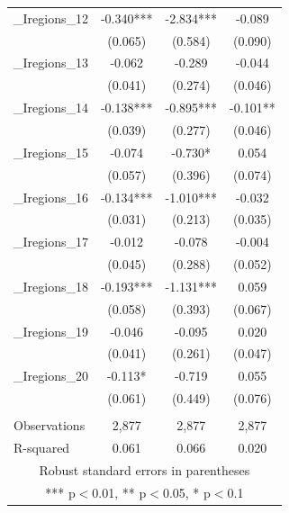 \documentclass[]{article}
\begin{document}
\begin{tabular}{lccc}
\_Iregions\_12 & -0.340*** & -2.834*** & -0.089 \\
 & (0.065) & (0.584) & (0.090) \\
\_Iregions\_13 & -0.062 & -0.289 & -0.044 \\
 & (0.041) & (0.274) & (0.046) \\
\_Iregions\_14 & -0.138*** & -0.895*** & -0.101** \\
 & (0.039) & (0.277) & (0.046) \\
\_Iregions\_15 & -0.074 & -0.730* & 0.054 \\
 & (0.057) & (0.396) & (0.074) \\
\_Iregions\_16 & -0.134*** & -1.010*** & -0.032 \\
 & (0.031) & (0.213) & (0.035) \\
\_Iregions\_17 & -0.012 & -0.078 & -0.004 \\
 & (0.045) & (0.288) & (0.052) \\
\_Iregions\_18 & -0.193*** & -1.131*** & 0.059 \\
 & (0.058) & (0.393) & (0.067) \\
\_Iregions\_19 & -0.046 & -0.095 & 0.020 \\
 & (0.041) & (0.261) & (0.047) \\
\_Iregions\_20 & -0.113* & -0.719 & 0.055 \\
 & (0.061) & (0.449) & (0.076) \\
 &  &  &  \\
Observations & 2,877 & 2,877 & 2,877 \\
 R-squared & 0.061 & 0.066 & 0.020 \\ \hline
\multicolumn{4}{c}{ Robust standard errors in parentheses} \\
\multicolumn{4}{c}{ *** p$<$0.01, ** p$<$0.05, * p$<$0.1} \\
\end{tabular}
\end{document}
